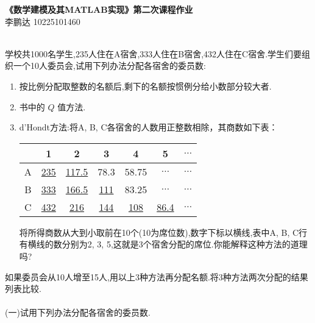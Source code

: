 \documentclass{article}
\begin{document}
\begin{center}
    \LARGE \textbf{\heiti 《数学建模及其{\timesfont MATLAB}实现》第二次课程作业} \\[0.5em]
    \large 李鹏达 10225101460
\end{center}

~\\

学校共1000名学生,235人住在A宿舍,333人住在B宿舍,432人住在C宿舍.学生们要组织一个10人委员会,试用下列办法分配各宿舍的委员数:

\begin{enumerate}
    \item 按比例分配取整数的名额后,剩下的名额按惯例分给小数部分较大者.
    \item 书中的 $Q$ 值方法.
    \item d'Hondt方法:将A, B, C各宿舍的人数用正整数相除，其商数如下表：
    
\begin{center}
    \begin{tabular}{|ccccccc|}
    \hline
    & 1 & 2 & 3 & 4 & 5 & $\dots$ \\
    \hline
    A & \underline{235} & \underline{117.5} & 78.3 & 58.75 & $\dots$ & $\dots$ \\
    B & \underline{333} & \underline{166.5} & \underline{111} & 83.25 & $\dots$ & $\dots$ \\
    C & \underline{432} & \underline{216} & \underline{144} & \underline{108} & \underline{86.4} & $\dots$ \\
    \hline
    \end{tabular}
\end{center}

将所得商数从大到小取前在10个(10为席位数),数字下标以横线,表中A, B, C行有横线的数分别为2, 3, 5,这就是3个宿舍分配的席位.你能解释这种方法的道理吗?
\end{enumerate}

如果委员会从10人增至15人,用以上3种方法再分配名额.将3种方法两次分配的结果列表比较.\\

\\

\noindent(一)试用下列办法分配各宿舍的委员数.
\end{document}
